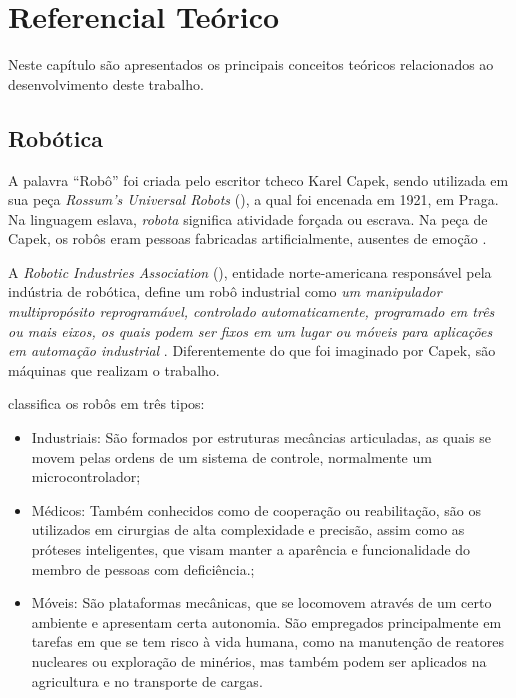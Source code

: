 
\chapter{Referencial Teórico} \label{cap:funda}

\vspace{-2cm} %

Neste capítulo são apresentados os principais conceitos teóricos relacionados ao desenvolvimento deste trabalho.


\vspace{1cm}
\section{Robótica} \label{cap:rob_auto}
A palavra ``Robô'' foi criada pelo escritor tcheco Karel Capek, sendo utilizada em sua peça 
\textit{Rossum's Universal Robots} (), a qual foi 
encenada em 1921, em Praga. Na linguagem eslava, \textit{robota} significa atividade 
forçada ou escrava. Na peça de Capek, os robôs eram pessoas fabricadas artificialmente, ausentes
de emoção \cite{polonskii1996}.\par
A \textit{Robotic Industries Association} (), 
entidade norte-americana responsável pela indústria de robótica, define um robô industrial como
 \textit{um manipulador multipropósito reprogramável, controlado automaticamente, programado em três 
 ou mais eixos, os quais podem ser fixos em um lugar ou móveis para aplicações em automação industrial} \cite{RIAdef}.
Diferentemente do que foi imaginado por Capek, são máquinas que realizam o trabalho.

 classifica os robôs em três tipos:
\begin{itemize}
 \item Industriais: São formados por estruturas mecâncias articuladas, as quais se movem pelas ordens de um sistema de 
 controle, normalmente um microcontrolador;
 \item Médicos: Também conhecidos como de cooperação ou reabilitação, são os utilizados em cirurgias de alta complexidade e 
 precisão, assim como as próteses inteligentes, que visam manter a aparência e funcionalidade do membro de pessoas com 
 deficiência.;
 \item Móveis: São plataformas mecânicas, que se locomovem através de um certo ambiente e apresentam certa autonomia.
São empregados principalmente em tarefas em que se tem risco à vida humana, como na manutenção de reatores nucleares ou 
exploração de 
minérios, mas também podem ser aplicados na agricultura e no transporte de cargas.
\end{itemize}


